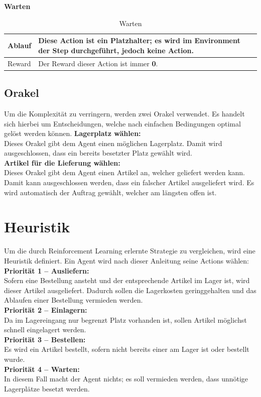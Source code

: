 \noindent\textbf{Warten}
\begin{table}[H]%
\begin{tabularx}{\textwidth} { 
  | >{\raggedright\arraybackslash}l 
  | >{\raggedright\arraybackslash}X|}
 \hline
  Ablauf &Diese Action ist ein Platzhalter; es wird im Environment der Step durchgeführt, jedoch keine Action.\\
\hline
 Reward &Der Reward dieser Action ist immer \textbf{0}.\\
 \hline
\end{tabularx}
\caption{Warten}
\end{table}%


\subsection{Orakel}
Um die Komplexität zu verringern, werden zwei Orakel verwendet. Es handelt sich hierbei um Entscheidungen, welche nach einfachen Bedingungen optimal gelöst werden können. 
\textbf{Lagerplatz wählen:}\\ Dieses Orakel gibt dem Agent einen möglichen Lagerplatz. Damit wird ausgeschlossen, dass ein bereits besetzter Platz gewählt wird.\\
\textbf{Artikel für die Lieferung wählen:}\\ Dieses Orakel gibt dem Agent einen Artikel an, welcher geliefert werden kann. Damit kann ausgeschlossen werden, dass ein falscher Artikel ausgeliefert wird. Es wird automatisch der Auftrag gewählt, welcher am längsten offen ist.



\section {Heuristik}
Um die durch Reinforcement Learning erlernte Strategie zu vergleichen, wird eine Heuristik definiert. Ein Agent wird nach dieser Anleitung seine Actions wählen:\\
\textbf{Priorität 1 – Ausliefern:}\\
Sofern eine Bestellung ansteht und der entsprechende Artikel im Lager ist, wird dieser Artikel ausgeliefert. Dadurch sollen die Lagerkosten geringgehalten und das Ablaufen einer Bestellung vermieden werden.\\
\textbf{Priorität 2 – Einlagern:}\\
Da im Lagereingang nur begrenzt Platz vorhanden ist, sollen Artikel möglichst schnell eingelagert werden.\\
\textbf{Priorität 3 – Bestellen:}\\
Es wird ein Artikel bestellt, sofern nicht bereits einer am Lager ist oder bestellt wurde.\\
\textbf{Priorität 4 – Warten:}\\
In diesem Fall macht der Agent nichts; es soll vermieden werden, dass unnötige Lagerplätze besetzt werden.


